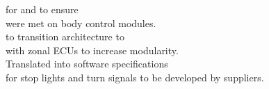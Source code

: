 \runsubsection{\textcolor{FordBlue}{Ford Motor Company}}
\runsubsection{\textcolor{FordBlue}{Vehicle Controls Group}}

\begin{minipage}{1\textwidth\vspace{2pt}}
\textcolor{FordBlue}{\mybar}\faAngleRight {} for  and to ensure\\ 
\textcolor{FordBlue}{\mybar}\textcolor{invisible}{\faAngleRight} 
were met on body control modules.\\
\textcolor{FordBlue}{\mybar}\faAngleRight {} to transition architecture to \\
\textcolor{FordBlue}{\mybar}\textcolor{invisible}{\faAngleRight}  with zonal ECUs to increase modularity.\\
\textcolor{FordBlue}{\mybar}\faAngleRight Translated into software specifications \\
\textcolor{FordBlue}{\mybar}\textcolor{invisible}{\faAngleRight}for stop lights and turn signals to be developed by suppliers. 

 

\end{minipage}